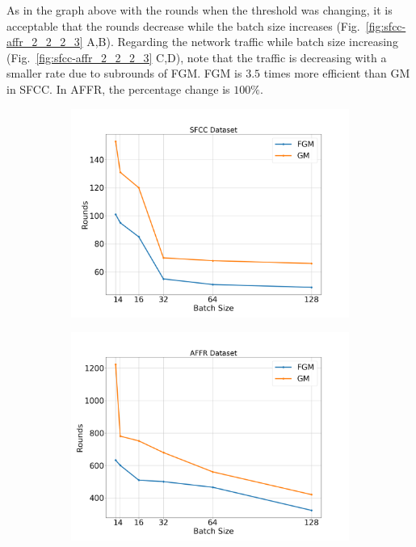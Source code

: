 As in the graph above with the rounds when the threshold was changing, it is acceptable that the rounds decrease while the batch size increases (Fig.~\ref{fig:sfcc-affr_2_2_2_3} A,B).
Regarding the network traffic while batch size increasing (Fig.~\ref{fig:sfcc-affr_2_2_2_3} C,D), note that the traffic is decreasing with a smaller rate due to subrounds of FGM\@.
FGM is $3.5$ times more efficient than GM in SFCC\@.
In AFFR, the percentage change is $100\%$.

\begin{figure}[H]
    \centering
    \begin{subfigure}[b]{0.45\textwidth}
        \centering
        \includegraphics[width=\textwidth]{./images/results/sfc-plots/exp_Fig_2_2.png}
        \caption{}
    \end{subfigure}
    \hfill
    \begin{subfigure}[b]{0.45\textwidth}
        \centering
        \includegraphics[width=\textwidth]{./images/results/amazon-plots/exp_Fig_2_2.png}

\end{subfigure}
\end{figure}
